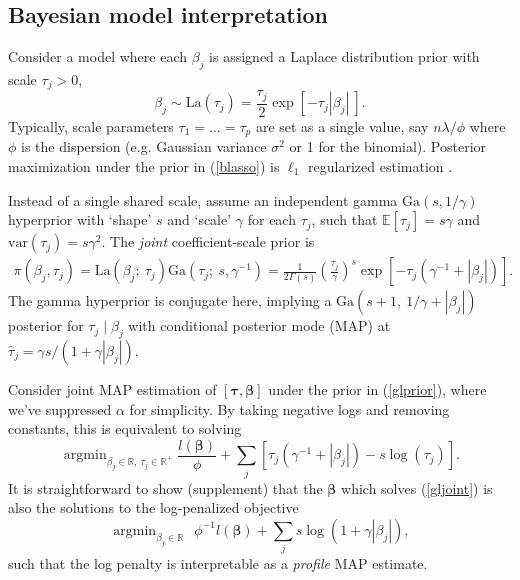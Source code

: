 \documentclass[12pt]{article}
\newcommand{\bs}[1]{\boldsymbol{#1}}
\newcommand{\mr}[1]{\mathrm{#1}}
\newcommand{\ds}[1]{\mathds{#1}}
\DeclareMathOperator*{\argmin}{argmin}
\begin{document}
\subsection{Bayesian model interpretation}

Consider a model where each $\beta_j$ is
assigned a Laplace distribution prior with scale $\tau_j>0$,
\begin{equation}\label{blasso}
\beta_j \sim \mr{La}\left(\tau_j\right) =
\frac{\tau_j}{2}\exp\left[ -\tau_j|\beta_j| ~\right].
\end{equation}
Typically, scale parameters $\tau_1 =
\ldots = \tau_p$ are set as a single value, say $n\lambda/\phi$ where
 $\phi$ is the dispersion (e.g. Gaussian variance
$\sigma^2$ or 1 for the binomial).   Posterior
maximization under the prior in (\ref{blasso}) is $\ell_1$ regularized estimation \citep[e.g.,][]{park_bayesian_2008}.

Instead of a single shared scale, assume an independent gamma
$\mr{Ga}(s,1/\gamma)$ hyperprior with `shape' $s$ and `scale' $\gamma$ for
each $\tau_j$, such that $\ds{E}[\tau_j] = s\gamma$ and $\mr{var}(\tau_j) =
s\gamma^2$.  The {\it joint} coefficient-scale prior is
\begin{align}\label{glprior}
\pi(\beta_j,\tau_j) = \mr{La}\left(\beta_j ;~ \tau_j\right)
\mr{Ga}\left(\tau_j;~ s,\gamma^{-1}\right) = \frac{ 1}{2\Gamma({s})} 
\left(\frac{\tau_j}{\gamma}\right)^{s}
               \exp\left[-\tau_j(\gamma^{-1}+|\beta_j|)\right].
\end{align}
The gamma hyperprior is conjugate here, implying a $\mr{Ga}\left(s+1, ~1/\gamma +
|\beta_j|\right)$ posterior for $\tau_j \mid \beta_j$ with conditional
posterior mode (MAP) at $\hat\tau_j = \gamma s/(1 + \gamma |\beta_j|)$.

Consider joint MAP estimation of $[\bs{\tau},\bs{\beta}]$ under the prior in
   (\ref{glprior}), where we've suppressed $\alpha$ for simplicity. By taking
   negative logs and removing constants, this is equivalent to solving
\begin{equation}\label{gljoint}
\argmin_{\beta_j\in\ds{R},~\tau_j \in \ds{R}^{+}}\!\!
\frac{l(\bs{\beta})}{\phi} + \sum_j \left[\tau_j(\gamma^{-1}+|\beta_j|) - s\log(\tau_j)\right].
\end{equation}
It is straightforward to show (supplement) that the $\bs{\beta}$ which solves (\ref{gljoint})  is also the solutions 
to the log-penalized objective 
\begin{equation}\label{logobj}
\argmin_{\beta_j\in\ds{R}}~~
\phi^{-1}l(\bs{\beta}) + \sum_j  s\log(1+\gamma|\beta_j|),
\end{equation}
such that the log penalty is interpretable as a {\it profile} MAP estimate.
\end{document}
